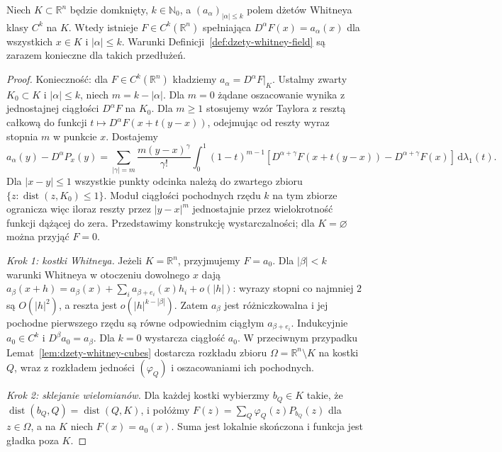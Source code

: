 \begin{twierdzenie}
\label{thm:dzety-whitney-extension}
Niech $K\subset\mathbb R^n$ będzie domknięty,
$k\in\mathbb N_0$, a $(a_\alpha)_{|\alpha|\le k}$
polem dżetów Whitneya klasy $C^k$ na $K$.
Wtedy istnieje $F\in C^k(\mathbb R^n)$ spełniająca
$D^\alpha F(x)=a_\alpha(x)$ dla wszystkich
$x\in K$ i $|\alpha|\le k$.
Warunki Definicji~\ref{def:dzety-whitney-field} są
zarazem konieczne dla takich przedłużeń.
\end{twierdzenie}

\begin{proof}
Konieczność: dla $F\in C^k(\mathbb R^n)$ kładziemy
$a_\alpha=D^\alpha F|_K$. Ustalmy zwarty $K_0\subset K$
i $|\alpha|\le k$, niech $m=k-|\alpha|$.
Dla $m=0$ żądane oszacowanie wynika z jednostajnej
ciągłości $D^\alpha F$ na $K_0$.
Dla $m\ge1$ stosujemy wzór Taylora z resztą całkową
do funkcji $t\mapsto D^\alpha F(x+t(y-x))$,
odejmując od reszty wyraz stopnia $m$ w punkcie $x$.
Dostajemy
\[
 a_\alpha(y)-D^\alpha P_x(y)
 =\sum_{|\gamma|=m}\frac{m(y-x)^\gamma}{\gamma!}
 \int_0^1(1-t)^{m-1}
 [D^{\alpha+\gamma}F(x+t(y-x))-D^{\alpha+\gamma}F(x)]
 \,\mathrm d\lambda_1(t).
\]
Dla $|x-y|\le1$ wszystkie punkty odcinka należą
do zwartego zbioru $\{z:\operatorname{dist}(z,K_0)\le1\}$.
Moduł ciągłości pochodnych rzędu $k$ na tym zbiorze
ogranicza więc iloraz reszty przez $|y-x|^m$
jednostajnie przez wielokrotność funkcji dążącej do zera.
Przedstawimy konstrukcję wystarczalności; dla $K=\varnothing$
można przyjąć $F=0$.

\emph{Krok 1: kostki Whitneya.}
Jeżeli $K=\mathbb R^n$, przyjmujemy $F=a_0$.
Dla $|\beta|<k$ warunki Whitneya w otoczeniu
dowolnego $x$ dają
$a_\beta(x+h)=a_\beta(x)+\sum_i a_{\beta+e_i}(x)h_i+o(|h|)$:
wyrazy stopni co najmniej $2$ są $O(|h|^2)$,
a reszta jest $o(|h|^{k-|\beta|})$.
Zatem $a_\beta$ jest różniczkowalna i jej pochodne
pierwszego rzędu są równe odpowiednim ciągłym
$a_{\beta+e_i}$. Indukcyjnie $a_0\in C^k$
i $D^\beta a_0=a_\beta$. Dla $k=0$ wystarcza
ciągłość $a_0$.
W przeciwnym przypadku Lemat~\ref{lem:dzety-whitney-cubes}
dostarcza rozkładu zbioru
$\Omega=\mathbb R^n\setminus K$
na kostki $Q$, wraz z rozkładem jedności
$(\varphi_Q)$ i oszacowaniami ich pochodnych.

\emph{Krok 2: sklejanie wielomianów.}
Dla każdej kostki wybierzmy $b_Q\in K$ takie, że
$\operatorname{dist}(b_Q,Q)=\operatorname{dist}(Q,K)$, i połóżmy
$F(z)=\sum_Q\varphi_Q(z)P_{b_Q}(z)$ dla $z\in\Omega$,
a na $K$ niech $F(x)=a_0(x)$. Suma jest lokalnie skończona
i funkcja jest gładka poza $K$.


\end{proof}
